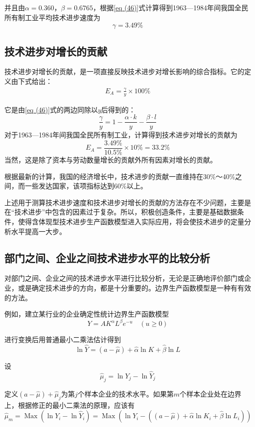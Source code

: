 	并且由$ \alpha = 0.360 $，$ \beta = 0.6765 $，根据\eqref{eq (46)}式计算得到1963—1984年间我国全民所有制工业平均技术进步速度为
	$$ \gamma = 3.49\% $$
		
\subsection{技术进步对增长的贡献} 
		
	技术进步对增长的贡献，是一项直接反映技术进步对增长影响的综合指标。它的定义由下式给出：
	\begin{align}
		E_{A}=\frac{\gamma}{y} \times 100 \%
		\label{eq (47)}
	\end{align}

	它是由\eqref{eq (46)}式的两边同除以$ y $后得到的：
	$$ \frac{\gamma}{y}=1-\frac{\alpha \cdot k}{y}-\frac{\beta \cdot l}{y} $$
	对于1963—1984年间我国全民所有制工业，计算得到技术进步对增长的贡献为
	$$ E_{A}=\frac{3.49 \%}{10.5 \%} \times 10 \%=33.2 \% $$
	当然，这是除了资本与劳动数量增长的贡献外所有因素对增长的贡献。
		
	根据最新的计算，我国的经济增长中，技术进步的贡献一直维持在30\%～40\%之间，而一些发达国家，该项指标达到60\%以上。
		
	上述用于测算技术进步速度和技术进步对增长的贡献的方法存在不少问题，主要是在“技术进步”中包含的因素过于复杂。所以，积极创造条件，主要是基础数据条件，使得含体现型技术进步生产函数模型进入实际应用，将会使技术进步的定量分析水平提高一大步。
		
\subsection{部门之间、企业之间技术进步水平的比较分析}
		
	对部门之间、企业之间的技术进步水平进行比较分析，无论是正确地评价部门或企业，或是确定技术进步的方向，都是十分重要的。边界生产函数模型是一种有有效的方法。
		
	例如，建立某行业的企业确定性统计边界生产函数模型
	$$ Y=A K^{\alpha} L^{\beta} e^{-u} \quad(u \geq 0) $$

	进行变换后用普通最小二乘法估计得到
	$$ \ln \hat{Y}=(a-\hat{\mu})+\hat{\alpha} \ln K+\hat{\beta} \ln L $$ 

	设   
	$$ \hat{\mu}_{j}=\ln Y_{j}-\ln \hat{Y}_{j} $$

	定义$ \left ( a-\hat{\mu} \right ) + \hat{\mu}_{j} $为第$ j $个样本企业的技术水平。如果第$ m $个样本企业处在边界上，根据修正的最小二乘法的原理，应该有
	$$ \hat{\mu}_{m}=\operatorname{Max}\left(\ln Y_{i}-\ln \hat{Y}_{i}\right)=\operatorname{Max}
	\left(\ln Y_{i}-\left((a-\hat{\mu})+\hat{\alpha} \ln K_{i}+\hat{\beta} \ln L_{i}\right)\right) $$

